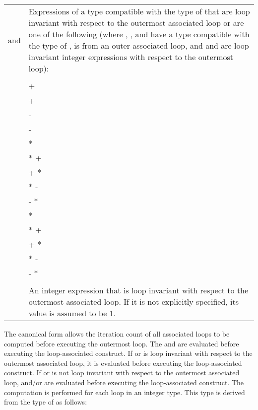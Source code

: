 \begin{fortranspecific}
\begin{supertabular}{ p{0.8in} p{4.5in}}
    {} and {} & Expressions of a type compatible with the
    type of {} that are loop invariant with respect to the outermost
    associated loop or are one of the following (where {},
    {}, and {} have a type compatible with the type of
    {}, {} is {} from an outer associated
    loop, and {} and {} are loop invariant integer
    expressions with respect to the outermost loop): \\
    & {} \\
    & {} + {} \\
    & {} + {} \\
    & {} - {} \\
    & {} - {} \\
    & {} {*} {} \\
    & {} {*} {} + {} \\
    & {} + {} {*} {} \\
    & {} {*} {} - {} \\
    & {} - {} {*} {} \\
    & {} {*} {} \\
    & {} {*} {} + {} \\
    & {} + {} {*} {} \\
    & {} {*} {} - {} \\
    & {} - {} {*} {} \\
    & \\

    {} & An integer expression that is loop invariant with respect
    to the outermost associated loop. If it is not explicitly specified, its value is
    assumed to be 1. \\
\end{supertabular}
\medskip
\end{fortranspecific}


\linenumbers

The canonical form allows the iteration count of all associated loops
to be computed before executing the outermost loop. The  and
 are evaluated before executing the loop-associated
construct. If  or  is loop invariant with respect to
the outermost associated loop, it is evaluated before executing the
loop-associated construct. If  or  is not loop
invariant with respect to the outermost associated loop, 
and/or  are evaluated before executing the loop-associated
construct. The computation is performed for each loop in an integer
type. This type is derived from the type of  as follows:


